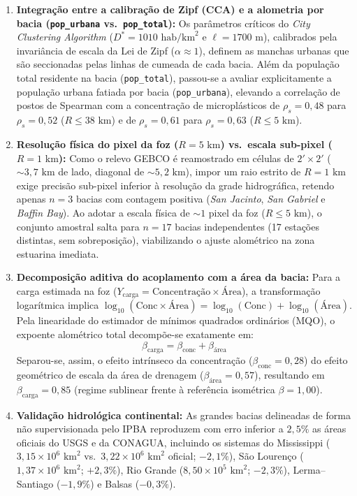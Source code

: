 \documentclass[12pt,a4paper]{article}
\begin{document}
\begin{enumerate}
    \item \textbf{Integração entre a calibração de Zipf (CCA) e a alometria por bacia (\texttt{pop\_urbana} vs.\ \texttt{pop\_total}):}
    Os parâmetros críticos do \textit{City Clustering Algorithm} ($D^* = 1010\text{ hab/km}^2$ e $\ell = 1700\text{ m}$), calibrados pela invariância de escala da Lei de Zipf ($\alpha \approx 1$), definem as manchas urbanas que são seccionadas pelas linhas de cumeada de cada bacia. Além da população total residente na bacia (\texttt{pop\_total}), passou-se a avaliar explicitamente a população urbana fatiada por bacia (\texttt{pop\_urbana}), elevando a correlação de postos de Spearman com a concentração de microplásticos de $\rho_s = 0{,}48$ para $\rho_s = 0{,}52$ ($R \le 38\text{ km}$) e de $\rho_s = 0{,}61$ para $\rho_s = 0{,}63$ ($R \le 5\text{ km}$).

    \item \textbf{Resolução física do pixel da foz ($R = 5\text{ km}$) vs.\ escala sub-pixel ($R = 1\text{ km}$):}
    Como o relevo GEBCO é reamostrado em células de $2' \times 2'$ ($\sim 3{,}7\text{ km}$ de lado, diagonal de $\sim 5{,}2\text{ km}$), impor um raio estrito de $R = 1\text{ km}$ exige precisão sub-pixel inferior à resolução da grade hidrográfica, retendo apenas $n = 3$ bacias com contagem positiva (\textit{San Jacinto}, \textit{San Gabriel} e \textit{Baffin Bay}). Ao adotar a escala física de $\sim 1$ pixel da foz ($R \le 5\text{ km}$), o conjunto amostral salta para $n = 17$ bacias independentes (17 estações distintas, sem sobreposição), viabilizando o ajuste alométrico na zona estuarina imediata.

    \item \textbf{Decomposição aditiva do acoplamento com a área da bacia:}
    Para a carga estimada na foz ($Y_{\text{carga}} = \text{Concentração} \times \text{Área}$), a transformação logarítmica implica $\log_{10}(\text{Conc} \times \text{Área}) = \log_{10}(\text{Conc}) + \log_{10}(\text{Área})$. Pela linearidade do estimador de mínimos quadrados ordinários (MQO), o expoente alométrico total decompõe-se exatamente em:
    \begin{equation}
        \beta_{\text{carga}} = \beta_{\text{conc}} + \beta_{\text{área}}
    \end{equation}
    Separou-se, assim, o efeito intrínseco da concentração ($\beta_{\text{conc}} = 0{,}28$) do efeito geométrico de escala da área de drenagem ($\beta_{\text{área}} = 0{,}57$), resultando em $\beta_{\text{carga}} = 0{,}85$ (regime sublinear frente à referência isométrica $\beta = 1{,}00$).

    \item \textbf{Validação hidrológica continental:}
    As grandes bacias delineadas de forma não supervisionada pelo IPBA reproduzem com erro inferior a $2{,}5\%$ as áreas oficiais do USGS e da CONAGUA, incluindo os sistemas do Mississippi ($3{,}15 \times 10^6\text{ km}^2$ vs.\ $3{,}22 \times 10^6\text{ km}^2$ oficial; $-2{,}1\%$), São Lourenço ($1{,}37 \times 10^6\text{ km}^2$; $+2{,}3\%$), Rio Grande ($8{,}50 \times 10^5\text{ km}^2$; $-2{,}3\%$), Lerma--Santiago ($-1{,}9\%$) e Balsas ($-0{,}3\%$).
\end{enumerate}
\end{document}
